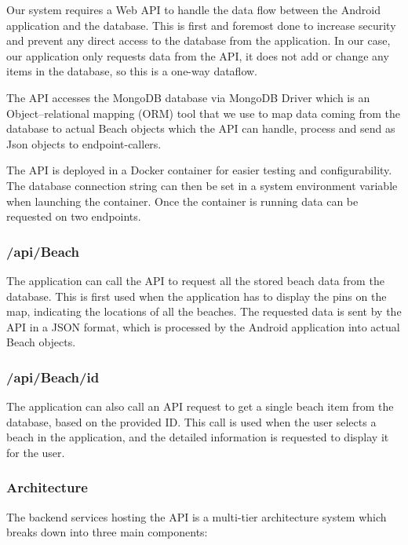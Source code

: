 Our system requires a Web API to handle the data flow between the Android application and the database. This is first and foremost done to increase security and prevent any direct access to the database from the application. In our case, our application only requests data from the API, it does not add or change any items in the database, so this is a one-way dataflow.

The API accesses the MongoDB database via MongoDB Driver which is an Object–relational mapping (ORM) tool that we use to map data coming from the database to actual Beach objects which the API can handle, process and send as Json objects to endpoint-callers. 

The API is deployed in a Docker container for easier testing and configurability. The database connection string can then be set in a system environment variable when launching the container. Once the container is running data can be requested on two endpoints.

\subsubsection{/api/Beach}

The application can call the API to request all the stored beach data from the database. This is first used when the application has to display the pins on the map, indicating the locations of all the beaches. The requested data is sent by the API in a JSON format, which is processed by the Android application into actual Beach objects.

\subsubsection{/api/Beach/{id}}

The application can also call an API request to get a single beach item from the database, based on the provided ID. This call is used when the user selects a beach in the application, and the detailed information is requested to display it for the user. 

\subsubsection{Architecture}

The backend services hosting the API is a multi-tier architecture system which breaks down into three main components:

